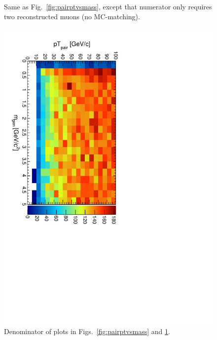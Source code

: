 \documentclass[12pt]{article}
\begin{document}
\begin{figure}[p]
\caption{Same as Fig.~\ref{fig:pairptvsmass}, except that numerator
  only requires two reconstructed muons (no
  MC-matching). \label{fig:pairptvsmassNoMCMatch}}
\end{figure}

\begin{figure}
\begin{center}
\includegraphics[height=0.5\linewidth, angle=90]{fig/acceptance_plot/pairptvsmass_TrackerMuons_denominator.pdf}
\end{center}
\caption{Denominator of plots in Figs.~\ref{fig:pairptvsmass} and \ref{fig:pairptvsmassNoMCMatch}.}
\end{figure}
\end{document}

